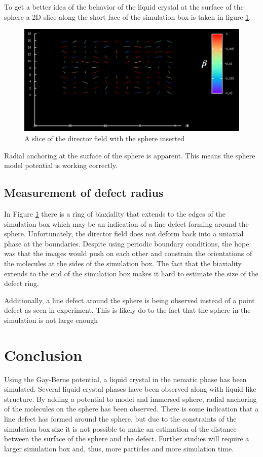 \documentclass[preprint, aps]{revtex4-1}
\begin{document}
To get a better idea of the behavior of the liquid crystal at the surface of the
sphere a 2D slice along the short face of the simulation box is taken in figure
\ref{fig:biaxial-2d}.
	\begin{figure}[H]
		\includegraphics[width=\textwidth]{biaxial-2d.png}
		\caption{A slice of the director field with the sphere inserted}
		\label{fig:biaxial-2d}
	\end{figure}
Radial anchoring at the surface of the sphere is apparent. This means the sphere
model potential is working correctly.

\subsection*{Measurement of defect radius}
In Figure \ref{fig:biaxial-2d} there is a ring of biaxiality that extends to the
edges of the simulation box which may be an indication of a line defect forming
around the sphere. Unfortunately, the director field does not deform back into a
uniaxial phase at the boundaries. Despite using periodic boundary conditions,
the hope was that the images would push on each other and constrain the
orientations of the molecules at the sides of the simulation box. The fact that
the biaxiality extends to the end of the simulation box makes it hard to
estimate the size of the defect ring.

Additionally, a line defect around the sphere is being observed instead of a
point defect as seen in experiment. This is likely do to the fact that the
sphere in the simulation is not large enough \cite{lubensky97}

\section*{Conclusion}
Using the Gay-Berne potential, a liquid crystal in the nematic phase has been
simulated. Several liquid crystal phases have been observed along with liquid
like structure. By adding a potential to model and immersed sphere, radial
anchoring of the molecules on the sphere has been observed. There is some
indication that a line defect has formed around the sphere, but due to the
constraints of the simulation box size it is not possible to make an estimation
of the distance between the surface of the sphere and the defect. Further
studies will require a larger simulation box and, thus, more particles and more
simulation time. 
\end{document}
